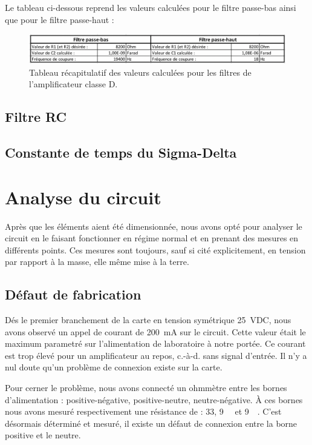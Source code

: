 \documentclass[10pt, oneside, a4paper]{article}
\begin{document}
Le tableau ci-dessous reprend les valeurs calculées pour le filtre passe-bas ainsi que pour le filtre passe-haut :
\begin{figure}[htbp]
    \centering
    \includegraphics[scale=0.65]{image/tableau-filtres.jpg}
    \caption{Tableau récapitulatif des valeurs calculées pour les filtres de l'amplificateur classe D.}
\end{figure}

\subsection{Filtre RC}

\subsection{Constante de temps du Sigma-Delta}

\section{Analyse du circuit}
Après que les éléments aient été dimensionnée, nous avons opté pour analyser le circuit en le faisant fonctionner en régime normal et en prenant des mesures en différents points.
Ces mesures sont toujours, sauf si cité explicitement, en tension par rapport à la masse, elle même mise à la terre.

\subsection{Défaut de fabrication}
Dés le premier branchement de la carte en tension symétrique \pm\SI{25}{\volt}DC,
nous avons observé un appel de courant de \SI{200}{\milli\ampere} sur le circuit.
Cette valeur était le maximum parametré sur l'alimentation de laboratoire à notre portée.
Ce courant est trop élevé pour un amplificateur au repos, c.-à-d. sans signal d'entrée.
Il n'y a nul doute qu'un problème de connexion existe sur la carte.

Pour cerner le problème, nous avons connecté un ohmmètre entre les bornes d'alimentation : positive-négative, positive-neutre, neutre-négative.
À ces bornes nous avons mesuré respectivement une résistance de : \SI{33}{\Omega}, \SI{9}{\kilo\Omega} et \SI{9}{\kilo\Omega}.
C'est désormais déterminé et mesuré, il existe un défaut de connexion entre la borne positive et le neutre.
\end{document}
